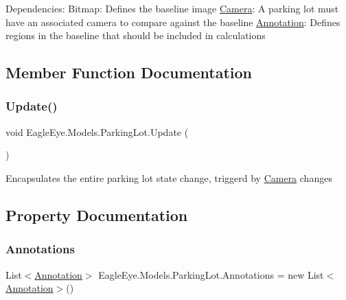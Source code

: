 Dependencies\+: Bitmap\+: Defines the baseline image \mbox{\hyperlink{class_eagle_eye_1_1_models_1_1_camera}{Camera}}\+: A parking lot must have an associated camera to compare against the baseline \mbox{\hyperlink{class_eagle_eye_1_1_models_1_1_annotation}{Annotation}}\+: Defines regions in the baseline that should be included in calculations 

\subsection{Member Function Documentation}
\mbox{\label{class_eagle_eye_1_1_models_1_1_parking_lot_a7e3c86f8ba1c0de2e4d0a2ec7d14a653}} 
\subsubsection{\texorpdfstring{Update()}{Update()}}
{\footnotesize\ttfamily void Eagle\+Eye.\+Models.\+Parking\+Lot.\+Update (\begin{DoxyParamCaption}{ }\end{DoxyParamCaption})}



Encapsulates the entire parking lot state change, triggerd by \mbox{\hyperlink{class_eagle_eye_1_1_models_1_1_camera}{Camera}} changes 



\subsection{Property Documentation}
\mbox{\label{class_eagle_eye_1_1_models_1_1_parking_lot_a8a80d92c49b0671de35a6649411a8593}} 
\subsubsection{\texorpdfstring{Annotations}{Annotations}}
{\footnotesize\ttfamily List$<$\mbox{\hyperlink{class_eagle_eye_1_1_models_1_1_annotation}{Annotation}}$>$ Eagle\+Eye.\+Models.\+Parking\+Lot.\+Annotations = new List$<$\mbox{\hyperlink{class_eagle_eye_1_1_models_1_1_annotation}{Annotation}}$>$()\hspace{0.3cm}{\ttfamily [get]}}



